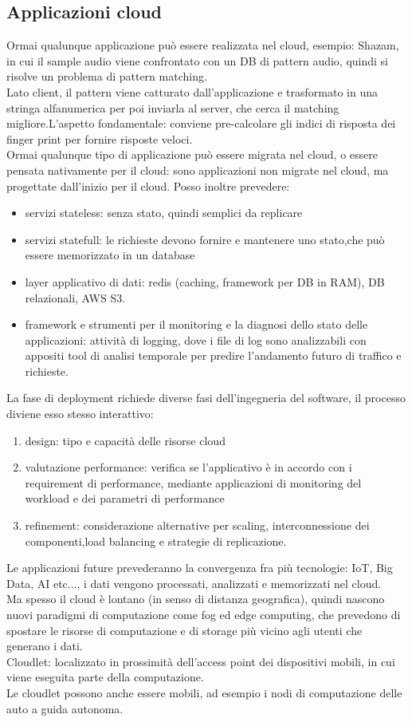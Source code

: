 \documentclass[16px]{article}
\begin{document}
\subsection{Applicazioni cloud}
Ormai qualunque applicazione può essere realizzata nel cloud, esempio: Shazam, in cui il sample audio viene confrontato con un DB di pattern audio, quindi si risolve un problema di pattern matching.\\ Lato client, il pattern viene catturato dall'applicazione e trasformato in una stringa alfanumerica per poi inviarla al server, che cerca il matching migliore.L'aspetto fondamentale: conviene pre-calcolare gli indici di risposta dei finger print per fornire risposte veloci.\\ Ormai qualunque tipo di applicazione può essere migrata nel cloud, o essere pensata nativamente per il cloud: sono applicazioni non migrate nel cloud, ma progettate dall'inizio per il cloud. Posso inoltre prevedere:
\begin{itemize}
\item servizi stateless: senza stato, quindi semplici da replicare
\item servizi statefull: le richieste devono fornire e mantenere uno stato,che può essere memorizzato in un database 
\item layer applicativo di dati: redis (caching, framework per DB in RAM), DB relazionali, AWS S3.
\item framework e strumenti per il monitoring e la diagnosi dello stato delle applicazioni: attività di logging, dove i file di log sono analizzabili con appositi tool di analisi temporale per predire l'andamento futuro di traffico e richieste.
\end{itemize}
La fase di deployment richiede diverse fasi dell'ingegneria del software, il processo diviene esso stesso interattivo:
\begin{enumerate}
\item design: tipo e capacità delle risorse cloud
\item valutazione performance: verifica se l'applicativo è in accordo con i requirement di performance, mediante applicazioni di monitoring del workload e dei parametri di performance
\item refinement: considerazione alternative per scaling, interconnessione dei componenti,load balancing e strategie di replicazione.
\end{enumerate}
Le applicazioni future prevederanno la convergenza fra più tecnologie: IoT, Big Data, AI etc..., i dati vengono processati, analizzati e memorizzati nel cloud.\\ Ma spesso il cloud è lontano (in senso di distanza geografica), quindi nascono nuovi paradigmi di computazione come fog ed edge computing, che prevedono di spostare le risorse di computazione e di storage più vicino agli utenti che generano i dati.\\ Cloudlet: localizzato in prossimità dell'access point dei dispositivi mobili, in cui viene eseguita parte della computazione.\\ Le cloudlet possono anche essere mobili, ad esempio i nodi di computazione delle auto a guida autonoma.
\end{document}
